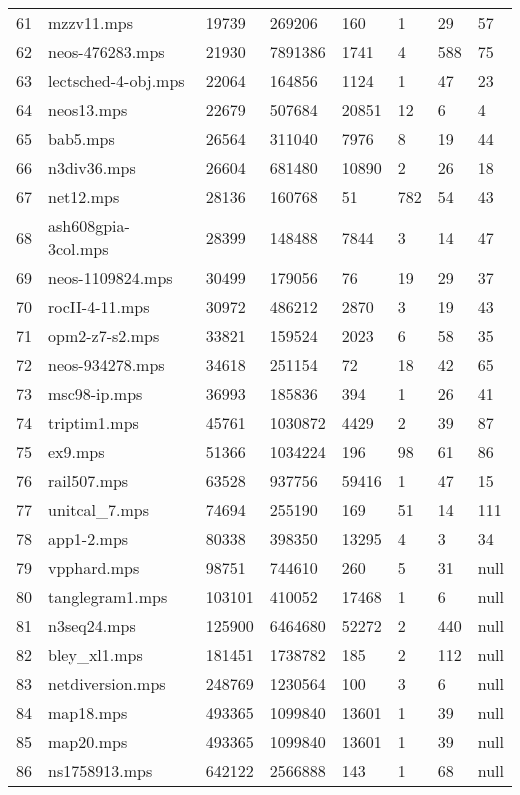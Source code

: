 \documentclass{article}
\begin{document}
\begin{longtable}{|l |l |l |l |l |l |l |l |}
61&mzzv11.mps&19739&269206&160&1&29&57\\
62&neos-476283.mps&21930&7891386&1741&4&588&75\\
63&lectsched-4-obj.mps&22064&164856&1124&1&47&23\\
64&neos13.mps&22679&507684&20851&12&6&4\\
65&bab5.mps&26564&311040&7976&8&19&44\\
66&n3div36.mps&26604&681480&10890&2&26&18\\
67&net12.mps&28136&160768&51&782&54&43\\
68&ash608gpia-3col.mps&28399&148488&7844&3&14&47\\
69&neos-1109824.mps&30499&179056&76&19&29&37\\
70&rocII-4-11.mps&30972&486212&2870&3&19&43\\
71&opm2-z7-s2.mps&33821&159524&2023&6&58&35\\
72&neos-934278.mps&34618&251154&72&18&42&65\\
73&msc98-ip.mps&36993&185836&394&1&26&41\\
74&triptim1.mps&45761&1030872&4429&2&39&87\\
75&ex9.mps&51366&1034224&196&98&61&86\\
76&rail507.mps&63528&937756&59416&1&47&15\\
77&unitcal_7.mps&74694&255190&169&51&14&111\\
78&app1-2.mps&80338&398350&13295&4&3&34\\
79&vpphard.mps&98751&744610&260&5&31&null\\
80&tanglegram1.mps&103101&410052&17468&1&6&null\\
81&n3seq24.mps&125900&6464680&52272&2&440&null\\
82&bley_xl1.mps&181451&1738782&185&2&112&null\\
83&netdiversion.mps&248769&1230564&100&3&6&null\\
84&map18.mps&493365&1099840&13601&1&39&null\\
85&map20.mps&493365&1099840&13601&1&39&null\\
86&ns1758913.mps&642122&2566888&143&1&68&null\\
\hline
\end{longtable}
\end{document}
